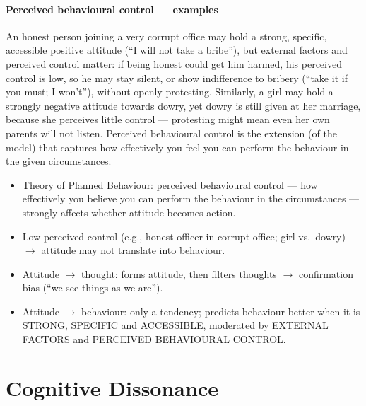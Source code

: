 \paragraph{Perceived behavioural control --- examples} An honest person joining a very corrupt office may hold a strong, specific, accessible positive attitude (``I will not take a bribe''), but external factors and perceived control matter: if being honest could get him harmed, his perceived control is low, so he may stay silent, or show indifference to bribery (``take it if you must; I won't''), without openly protesting. Similarly, a girl may hold a strongly negative attitude towards dowry, yet dowry is still given at her marriage, because she perceives little control --- protesting might mean even her own parents will not listen. Perceived behavioural control is the extension (of the model) that captures how effectively you feel you can perform the behaviour in the given circumstances.

\begin{KeyConcept}
\begin{itemize}
\item Theory of Planned Behaviour: perceived behavioural control --- how effectively you believe you can perform the behaviour in the circumstances --- strongly affects whether attitude becomes action.
\item Low perceived control (e.g., honest officer in corrupt office; girl vs.\ dowry) $\rightarrow$ attitude may not translate into behaviour.
\end{itemize}
\end{KeyConcept}

\begin{QuickRevision}
\begin{itemize}
\item Attitude $\rightarrow$ thought: forms attitude, then filters thoughts $\rightarrow$ confirmation bias (``we see things as we are'').
\item Attitude $\rightarrow$ behaviour: only a tendency; predicts behaviour better when it is STRONG, SPECIFIC and ACCESSIBLE, moderated by EXTERNAL FACTORS and PERCEIVED BEHAVIOURAL CONTROL.
\end{itemize}
\end{QuickRevision}

\section{Cognitive Dissonance}

